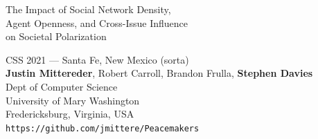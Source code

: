 \documentclass[12pt]{beamer}
\begin{document}
\begin{frame}[c]{}

\begin{center}
\Large
The Impact of Social Network Density,\\Agent Openness, and Cross-Issue
Influence\\on Societal Polarization

\footnotesize
\vspace{.3in}
CSS 2021 --- Santa Fe, New Mexico (sorta)\\
\vspace{.1in}
\textbf{Justin Mittereder}, Robert Carroll, Brandon Frulla,
\textbf{Stephen Davies}\\
\scriptsize
\smallskip
Dept of Computer Science\\
University of Mary Washington\\
Fredericksburg, Virginia, USA\\
\bigskip
\bigskip
\texttt{https://github.com/jmittere/Peacemakers}
\end{center}

\end{frame}
\end{document}
